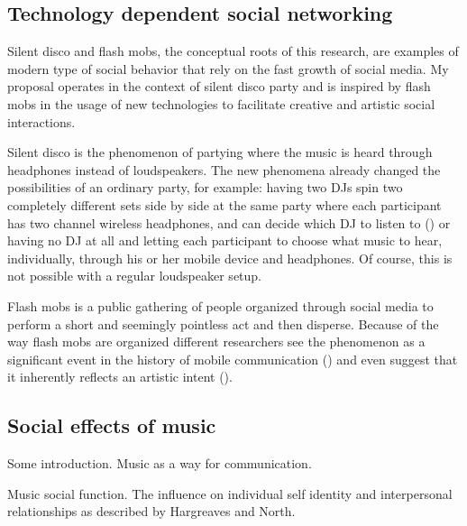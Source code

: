 \documentclass[a4paper,11pt]{article}
\begin{document}
\subsection{Technology dependent social networking}

Silent disco and flash mobs, the conceptual roots of this research, are examples of modern type of social behavior that rely on the fast growth of social media.
My proposal operates in the context of silent disco party and is inspired by flash mobs in the usage of new technologies to facilitate creative and artistic social interactions.

Silent disco is the phenomenon of partying where the music is heard through headphones instead of loudspeakers.
The new phenomena already changed the possibilities of an ordinary party, for example: having two DJs spin two completely different sets side by side at the same party where each participant has two channel wireless headphones, and can decide which DJ to listen to (\citeauthor{web:headphonedisco}) or having no DJ at all and letting each participant to choose what music to hear, individually, through his or her mobile device and headphones.
Of course, this is not possible with a regular loudspeaker setup.

Flash mobs is a public gathering of people organized through social media to perform a short and seemingly pointless act and then disperse.
Because of the way flash mobs are organized different researchers see the phenomenon as a significant event in the history of mobile communication (\cite{nicholson05}) and even suggest that it inherently reflects an artistic intent (\cite{brejzek10}).

\subsection{Social effects of music}



Some introduction.
Music as a way for communication.

Music social function.
The influence on individual self identity and interpersonal relationships as described by Hargreaves and North.
\end{document}
